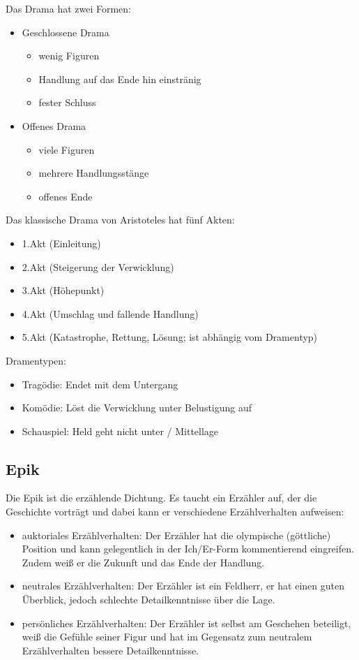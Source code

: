 \documentclass[12pt,a4paper]{article}
\begin{document}
Das Drama hat zwei Formen:

	\begin{itemize}
	\item Geschlossene Drama
		\begin{itemize}
		\item wenig Figuren
		\item Handlung auf das Ende hin einstränig
		\item fester Schluss
		\end{itemize}
	\item Offenes Drama
		\begin{itemize}
		\item viele Figuren
		\item mehrere Handlungsstänge
		\item offenes Ende
		\end{itemize}
	\end{itemize}
	
Das klassische Drama von Aristoteles hat fünf Akten:

	\begin{itemize}
	\item 1.Akt (Einleitung)
	\item 2.Akt (Steigerung der Verwicklung)
	\item 3.Akt (Höhepunkt)
	\item 4.Akt (Umschlag und fallende Handlung)
	\item 5.Akt (Katastrophe, Rettung, Lösung; ist abhängig vom Dramentyp)
	\end{itemize}
	
Dramentypen:

	\begin{itemize}
	\item Tragödie: Endet mit dem Untergang
	\item Komödie: Löst die Verwicklung unter Belustigung auf
	\item Schauspiel: Held geht nicht unter / Mittellage
	\end{itemize}

\subsection{Epik}

Die Epik ist die erzählende Dichtung. Es taucht ein Erzähler auf, der die Geschichte vorträgt und dabei kann er verschiedene Erzählverhalten aufweisen:

	\begin{itemize}
	\item auktoriales Erzählverhalten: Der Erzähler hat die olympische (göttliche) Position und kann gelegentlich in der Ich/Er-Form kommentierend eingreifen. Zudem weiß er die Zukunft und das Ende der Handlung.
	\item neutrales Erzählverhalten: Der Erzähler ist ein Feldherr, er hat einen guten Überblick, jedoch schlechte Detailkenntnisse über die Lage.
	\item persönliches Erzählverhalten: Der Erzähler ist selbst am Geschehen  beteiligt, weiß die Gefühle seiner Figur und hat im Gegensatz zum neutralem Erzählverhalten bessere Detailkenntnisse.
	\end{itemize}
	
\end{document}

